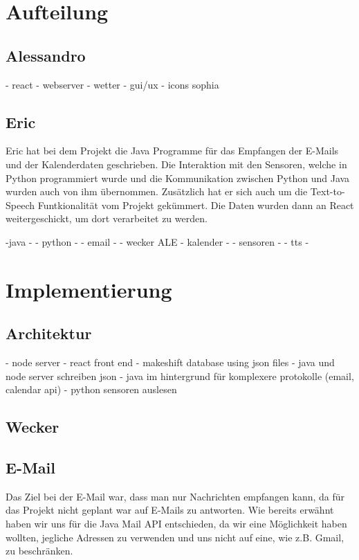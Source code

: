 \documentclass[11pt,a4paper]{article}
\begin{document}
\section{Aufteilung}
\subsection{Alessandro}
- react
- webserver
- wetter
- gui/ux
- icons sophia

\subsection{Eric}
Eric hat bei dem Projekt die Java Programme für das Empfangen der E-Mails und der Kalenderdaten geschrieben. Die Interaktion mit den Sensoren, welche in Python programmiert wurde und die Kommunikation zwischen Python und Java wurden auch von ihm \"ubernommen. Zusätzlich hat er sich auch um die Text-to-Speech Funtkionalit\"at vom Projekt gek\"ummert. Die Daten wurden dann an React weitergeschickt, um dort verarbeitet zu werden. 
 
-java -
- python  -
- email - 
- wecker ALE
- kalender -
- sensoren -
- tts -

\section{Implementierung}
\subsection{Architektur} %
- node server
- react front end
- makeshift database using json files
- java und node server schreiben json
- java im hintergrund für komplexere protokolle (email, calendar api)
- python sensoren auslesen

\subsection{Wecker}

\subsection{E-Mail}
Das Ziel bei der E-Mail war, dass man nur Nachrichten empfangen kann, da f\"ur das Projekt nicht geplant war auf E-Mails zu antworten. Wie bereits erw\"ahnt haben wir uns f\"ur die Java Mail API entschieden, da wir eine M\"oglichkeit haben wollten, jegliche Adressen zu verwenden und uns nicht auf eine, wie z.B. Gmail, zu beschr\"anken.
\end{document}
